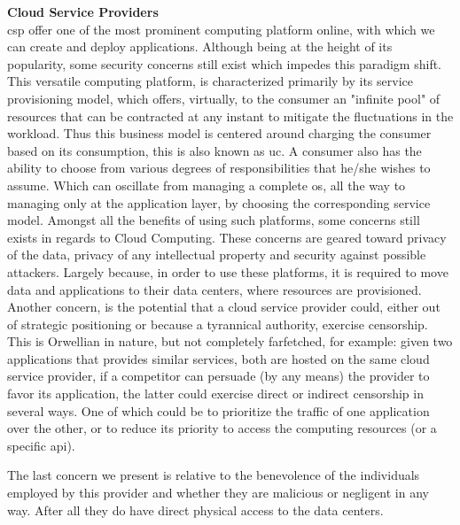 \documentclass[12pt, titlepage]{uo_temp}
\begin{document}
     \textbf{Cloud Service Providers}\\ 
     \gls{csp} offer one of the most prominent computing platform online, with which we
     can create and deploy applications. Although being at the height of its popularity, some
     security concerns still exist which impedes this paradigm shift. 
     This versatile computing platform, is characterized primarily by its service
     provisioning model, which offers, virtually, to the consumer an "infinite pool" of
     resources that can be contracted at any instant to mitigate the fluctuations in the
     workload. Thus this business model is centered around charging the consumer based on
     its consumption, this is also known as \gls{uc}.
     A consumer also has the ability to choose from various degrees of responsibilities that
     he/she wishes to assume. Which can oscillate from managing a complete \gls{os}, all
     the way to managing only at the application layer, by choosing the corresponding
     service model.     
     Amongst all the benefits of using such platforms, some concerns still exists in
     regards to Cloud Computing. These concerns are geared toward privacy of the data,
     privacy of any intellectual property and security against possible attackers.  
     Largely because, in order to use these platforms, it is required to move data
     and applications to their data centers, where resources are provisioned.
     Another concern, is the potential that a cloud service provider could, either out of
     strategic positioning or because a tyrannical authority, exercise censorship. This is
     Orwellian in nature, but not completely farfetched, for example: given two
     applications that provides similar services, both are hosted on the same cloud
     service provider, if a competitor can persuade (by any means) the provider to favor
     its application, the latter could exercise direct or indirect censorship in several
     ways. One of which could be to prioritize the traffic of one application over the
     other, or to reduce its priority to access the computing resources (or a specific
     \gls{api}).
    
     The last concern we present is relative to the benevolence of the individuals
     employed by this provider and whether they are malicious or negligent in any
     way. After all they do have direct physical access to the data centers.
\end{document}

